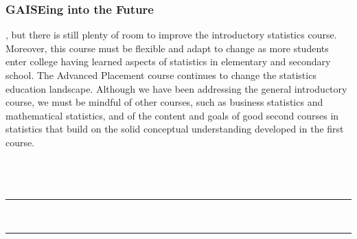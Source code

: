 \documentclass[twoside,openany]{tufte-book}
\begin{document}
\section{\textbf{GAISEing into the Future}}
 
, but there is still plenty of room to improve the introductory statistics course. Moreover, this course must be flexible and adapt to change as more students enter college having learned aspects of statistics in elementary and secondary school. The Advanced Placement course continues to change the statistics education landscape. Although we have been addressing the general introductory course, we must be mindful of other courses, such as business statistics and mathematical statistics, and of the content and goals of good second courses in statistics that build on the solid conceptual understanding developed in the first course.


\part*{}

\noindent {} \\
   \noindent\color{graylight}\rule[0cm]{3.25in}{0.03cm} \\
    \noindent\color{graylight}\rule[0.4cm]{3.25in}{0.03cm} \\
\color{black}
\vspace{.05in}

\renewcommand{\theenumi}{\arabic{enumi}.}
\renewcommand{\labelenumi}{\theenumi}
\renewcommand{\theenumii}{\alph{enumii}.}
\renewcommand{\labelenumii}{\theenumii}
\end{document}
